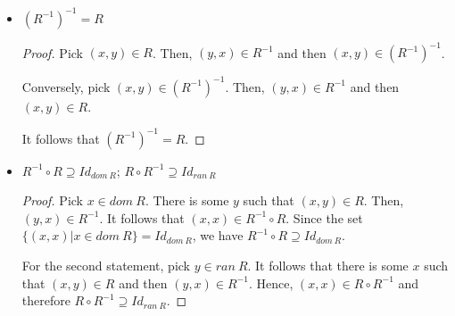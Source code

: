 \begin{itemize}
\begin{proof}
    \vspace{1em}
    
    For the second statement, pick $y \in ran~R$. Then, there is some $x$ such that $(x,y) \in R$. It follows that $(y,x) \in R^{-1}$ and hence $y \in dom~R^{-1}$. Therefore, $ran~R \subseteq dom~R^{-1}$. Conversely, pick $y \in dom~R^{-1}$. Then, there is some $x$ such that $(y,x) \in R^{-1}$. It follows that $(x,y) \in R$, and hence $y \in ran~R$. Therefore $dom~R^{-1} \subseteq ran~R$. From the two statements, we have that $dom R^{-1} = ran~R$.
    \end{proof}
    
    \item $(R^{-1})^{-1} = R$
        
    \begin{proof}
    Pick $(x,y) \in R$. Then, $(y, x) \in R^{-1}$ and then $(x,y) \in (R^{-1})^{-1}$.
    
    Conversely, pick $(x,y) \in (R^{-1})^{-1}$. Then, $(y,x) \in R^{-1}$ and then $(x,y) \in R$.
    
    It follows that $(R^{-1})^{-1} = R$.
    \end{proof}
    
    \item $R^{-1} \circ R \supseteq Id_{dom~R}$; $R \circ R^{-1} \supseteq Id_{ran~R}$
    
    \begin{proof}
    
    Pick $x \in dom~R$. There is some $y$ such that $(x,y) \in R$. Then, $(y, x) \in R^{-1}$. It follows that $(x,x) \in R^{-1} \circ R$. Since the set $\{(x,x) | x \in dom~R\} =  Id_{dom~R}$, we have $R^{-1} \circ R \supseteq Id_{dom~R}$.
    
    \vspace{1em}
    
    For the second statement, pick $y \in ran~R$. It follows that there is some $x$ such that $(x,y) \in R$ and then $(y, x) \in R^{-1}$. Hence, $(x,x) \in R \circ R^{-1}$ and therefore $R \circ R^{-1} \supseteq Id_{ran~R}$.
    
    \end{proof}
    

    
\end{itemize}


